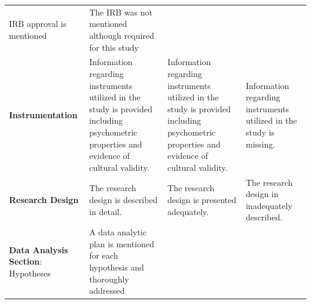 \documentclass[
  openany]{book}
\begin{document}
\begin{longtable}[]{@{}llll@{}}
\begin{minipage}[t]{0.22\columnwidth}
IRB approval is mentioned\strut
\end{minipage} & \begin{minipage}[t]{0.22\columnwidth}\raggedright
The IRB was not mentioned although required for this study\strut
\end{minipage}\tabularnewline
\begin{minipage}[t]{0.22\columnwidth}\raggedright
\textbf{Instrumentation}\strut
\end{minipage} & \begin{minipage}[t]{0.22\columnwidth}\raggedright
Information regarding instruments utilized in the study is provided including psychometric properties and evidence of cultural validity.\strut
\end{minipage} & \begin{minipage}[t]{0.22\columnwidth}\raggedright
Information regarding instruments utilized in the study is provided including psychometric properties and evidence of cultural validity.\strut
\end{minipage} & \begin{minipage}[t]{0.22\columnwidth}\raggedright
Information regarding instruments utilized in the study is missing.\strut
\end{minipage}\tabularnewline
\begin{minipage}[t]{0.22\columnwidth}\raggedright
\textbf{Research Design}\strut
\end{minipage} & \begin{minipage}[t]{0.22\columnwidth}\raggedright
The research design is described in detail.\strut
\end{minipage} & \begin{minipage}[t]{0.22\columnwidth}\raggedright
The research design is presented adequately.\strut
\end{minipage} & \begin{minipage}[t]{0.22\columnwidth}\raggedright
The research design in inadequately described.\strut
\end{minipage}\tabularnewline
\begin{minipage}[t]{0.22\columnwidth}\raggedright
\textbf{Data Analysis Section}: Hypotheses\strut
\end{minipage} & \begin{minipage}[t]{0.22\columnwidth}\raggedright
A data analytic plan is mentioned for each hypothesis and thoroughly addressed\strut
\end{minipage} & \begin{minipage}[t]{0.22\columnwidth}\raggedright

\end{minipage}
\end{longtable}
\end{document}
